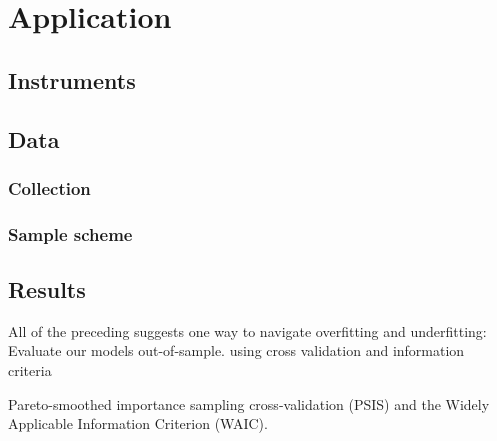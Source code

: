 \chapter{Application} \label{chap:application}

\section{Instruments}



\section{Data}

\subsection{Collection}

\subsection{Sample scheme}



\section{Results}

All of the preceding suggests one way to navigate overfitting and underfitting: Evaluate our models out-of-sample. using cross validation and information criteria

Pareto-smoothed importance sampling cross-validation (PSIS) and the  Widely Applicable Information Criterion (WAIC).